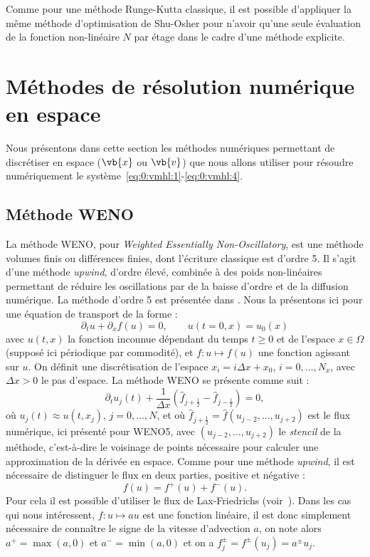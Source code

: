 Comme pour une méthode Runge-Kutta classique, il est possible d'appliquer la même méthode d'optimisation de Shu-Osher pour n'avoir qu'une seule évaluation de la fonction non-linéaire $N$ par étage dans le cadre d'une méthode explicite.


\section{Méthodes de résolution numérique en espace}

Nous présentons dans cette section les méthodes numériques permettant de discrétiser en espace ($\vb{x}$ ou $\vb{v}$) que nous allons utiliser pour résoudre numériquement le système~\eqref{eq:0:vmhl:1}-\eqref{eq:0:vmhl:4}.

\subsection{Méthode WENO}

La méthode WENO, pour \emph{Weighted Essentially Non-Oscillatory}, est une méthode volumes finis ou différences finies, dont l'écriture classique est d'ordre 5. Il s'agit d'une méthode \emph{upwind}, d'ordre élevé, combinée à des poids non-linéaires permettant de réduire les oscillations par de la baisse d'ordre et de la diffusion numérique. La méthode d'ordre 5 est présentée dans \cite{Liu:1994,Jiang:1996,Shu:1999,Shu:2003}. Nous la présentons ici pour une équation de transport de la forme :
$$
  \partial_t u + \partial_x f(u) = 0,\qquad u(t=0,x) = u_0(x)
$$
avec $u(t,x)$ la fonction inconnue dépendant du temps $t\geq 0$ et de l'espace $x\in\Omega$ (supposé ici périodique par commodité), et $f:u\mapsto f(u)$ une fonction agissant sur $u$. On définit une discrétisation de l'espace $x_i = i\Delta x + x_0$, $i=0,\dots,N_x$, avec $\Delta x>0$ le pas d'espace. La méthode WENO se présente comme suit :
$$
  \partial_t u_j(t) + \frac{1}{\Delta x}\left( \hat{f}_{j+\frac{1}{2}} - \hat{f}_{j-\frac{1}{2}} \right) = 0,
$$
où $u_j(t)\approx u(t,x_j)$, $j=0,\dots,N$, et où $\hat{f}_{j+\frac{1}{2}} = \hat{f}(u_{j-2},\dots,u_{j+2})$ est le flux numérique, ici présenté pour WENO5, avec $(u_{j-2},\dots,u_{j+2})$ le \emph{stencil} de la méthode, c'est-à-dire le voisinage de points nécessaire pour calculer une approximation de la dérivée en espace. Comme pour une méthode \emph{upwind}, il est nécessaire de distinguer le flux en deux parties, positive et négative :
$$
  f(u) = f^+(u) + f^-(u).
$$
Pour cela il est possible d'utiliser le flux de Lax-Friedrichs (voir~\cite{Shu:1997}). Dans les cas qui nous intéressent, $f:u\mapsto au$ est une fonction linéaire, il est donc simplement nécessaire de connaître le signe de la vitesse d'advection $a$, on note alors $a^+ = \max(a,0)$ et $a^-=\min(a,0)$ et on a $f^\pm_j=f^\pm(u_j)=a^\pm u_j$.

